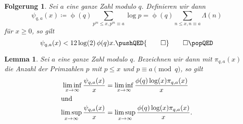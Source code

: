 \documentclass[a4paper,twoside,openright]{report}
\newtheorem{lem}[thm]{Lemma}
\newtheorem{cor}[thm]{Folgerung}
\theoremstyle{definition}
\theoremstyle{remark}
\DeclareMathOperator{\totient}{\phi}
\begin{document}
\begin{cor}
  \label{cor:chebychev}
  Sei $a$ eine ganze Zahl modulo $q$. Definieren wir dann
  \[
    \psi_{q, a}(x) \coloneqq \totient(q) \sum_{p^m \leq x, p^m \equiv a} \log p
    = \totient(q) \sum_{n \leq x, n \equiv a} \Lambda(n)
  \]
  für $x \ge 0$, so gilt
  \[
    \psi_{q, a}(x) < 12 \log(2) \totient(q) x.
    \pushQED{\qed}
    \qedhere
    \popQED
  \]
\end{cor}

\begin{lem}
  \label{lem:chebychev}
  Sei $a$ eine ganze Zahl modulo $q$.
  Bezeichnen wir dann mit $\pi_{q, a}(x)$ die Anzahl der Primzahlen $p$ mit $p \leq x$ und
  $p \equiv a \pmod q$, so gilt
  \begin{align*}
    \liminf_{x \to \infty} \frac{\psi_{q, a}(x)} x & = \liminf_{x \to \infty} \frac{\totient(q) \log(x) \pi_{q, a}(x)} x \\
    \intertext{und}
    \limsup_{x \to \infty} \frac{\psi_{q, a}(x)} x & = \limsup_{x \to \infty} \frac{\totient(q) \log(x) \pi_{q, a}(x)} x.
  \end{align*}
\end{lem}
\end{document}

